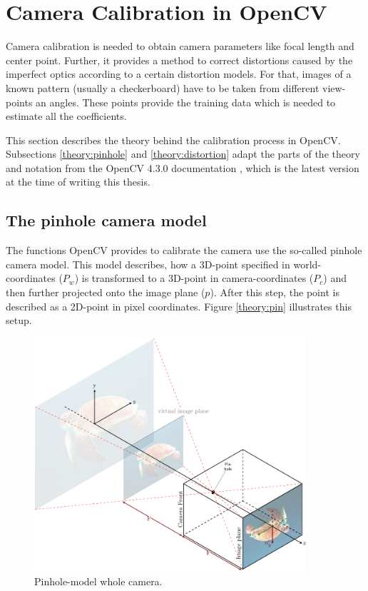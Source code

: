 \section{Camera Calibration in OpenCV\label{theory:calibration}}
Camera calibration is needed to obtain camera parameters like focal length and center point.
Further, it provides a method to correct distortions caused by the imperfect optics according to a certain distortion models.
For that, images of a known pattern (usually a checkerboard) have to be taken from different view-points an angles.
These points provide the training data which is needed to estimate all the coefficients.

This section describes the theory behind the calibration process in OpenCV.
Subsections \ref{theory:pinhole} and \ref{theory:distortion} adapt the parts of the theory and notation from the OpenCV 4.3.0 documentation \cite{cv_calib}, which is the latest version at the time of writing this thesis.

\subsection{The pinhole camera model\label{theory:pinhole}}
The functions OpenCV provides to calibrate the camera use the so-called pinhole camera model.
This model describes, how a 3D-point specified in world-coordinates ($P_w$) is transformed to a 3D-point in camera-coordinates ($P_c$) and then further projected onto the image plane ($p$). After this step, the point is described as a 2D-point in pixel coordinates.  Figure \ref{theory:pin} illustrates this setup.
\begin{figure}[ht]
	\centering
	\includegraphics[width=0.9\textwidth]{2-theory/cam/Camera2.pdf}
	\caption{Pinhole-model whole camera.\label{theory:pin1}}
\end{figure} 

